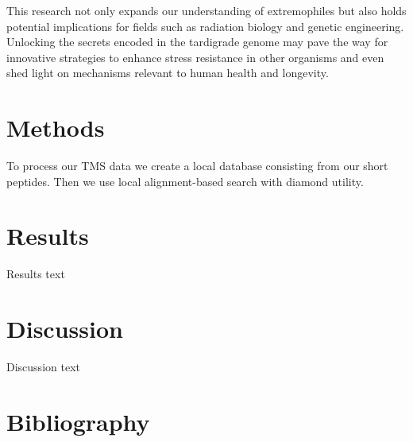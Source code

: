\documentclass{article}
\begin{document}
This research not only expands our understanding of extremophiles but also holds potential implications for fields such as radiation biology and genetic engineering. Unlocking the secrets encoded in the tardigrade genome may pave the way for innovative strategies to enhance stress resistance in other organisms and even shed light on mechanisms relevant to human health and longevity.

\section{Methods}
To process our TMS data we create a local database consisting from our short peptides. Then we use local alignment-based search with diamond \cite{buchfink_fast_2015} utility.

\section{Results}
Results text

\section{Discussion}
Discussion text

\newpage
\section{Bibliography}


\end{document}
